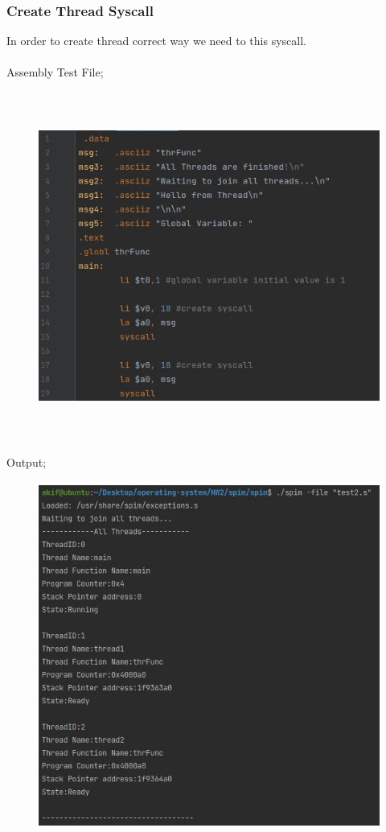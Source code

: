 \documentclass{article}
\begin{document}
\subsubsection{Create Thread Syscall}
In order to create thread correct way we need to this syscall.\\ \\
Assembly Test File;
\begin{figure}[H]
    \centering
	\includegraphics[width=6in, height=4.5in]{11.JPG}
	\caption[Optional caption]{}
	\label{}
\end{figure}
\cleardoublepage
Output;
\begin{figure}[H]
    \centering
	\includegraphics[width=6in, height=4.5in]{9.JPG}
	\caption[Optional caption]{}
	\label{}
\end{figure}
\end{document}

